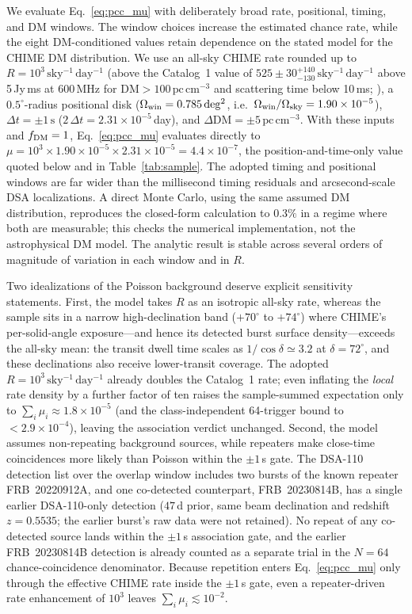 We evaluate Eq.~\eqref{eq:pcc_mu} with deliberately broad rate, positional,
timing, and DM windows. The window choices increase the estimated chance rate,
while the eight DM-conditioned values retain dependence on the stated model for
the CHIME DM distribution. We use an all-sky CHIME rate rounded up to
$R = 10^{3}\,\mathrm{sky^{-1}\,day^{-1}}$ (above the Catalog~1 value of
$525\pm30^{+140}_{-130}\,\mathrm{sky^{-1}\,day^{-1}}$ above 5\,Jy\,ms at
600\,MHz for $\mathrm{DM}>100\,\mathrm{pc\,cm^{-3}}$ and scattering time below
10\,ms; \citealt{CHIME2021Catalog}), a
$0.5^{\circ}$-radius positional disk ($\Omega_{\rm win}=0.785\,\mathrm{deg^2}$,
i.e.\ $\Omega_{\rm win}/\Omega_{\rm sky}=1.90\times10^{-5}$),
$\Delta t = \pm1\,\mathrm{s}$ ($2\,\Delta t = 2.31\times10^{-5}$\,day), and
$\Delta\mathrm{DM}=\pm5\,\mathrm{pc\,cm^{-3}}$. With these inputs and
$f_{\rm DM}=1$, Eq.~\eqref{eq:pcc_mu} evaluates directly to
$\mu = 10^{3}\times1.90\times10^{-5}\times2.31\times10^{-5}
= 4.4\times10^{-7}$, the position-and-time-only value quoted below and in
Table~\ref{tab:sample}.
The adopted timing and positional windows are far wider than the millisecond
timing residuals and arcsecond-scale DSA localizations. A direct Monte Carlo,
using the same assumed DM distribution, reproduces the closed-form calculation
to $0.3\%$ in a regime where both are measurable; this checks the numerical
implementation, not the astrophysical DM model. The analytic result is stable
across several orders of magnitude of variation in each window and in $R$.

Two idealizations of the Poisson background deserve explicit sensitivity
statements. First, the model takes $R$ as an isotropic all-sky rate, whereas
the sample sits in a narrow high-declination band ($+70^{\circ}$ to
$+74^{\circ}$) where CHIME's per-solid-angle exposure---and hence its detected
burst surface density---exceeds the all-sky mean: the transit dwell time
scales as $1/\cos\delta\simeq3.2$ at $\delta=72^{\circ}$, and these
declinations also receive lower-transit coverage. The adopted
$R=10^{3}\,\mathrm{sky^{-1}\,day^{-1}}$ already doubles the Catalog~1 rate;
even inflating the \emph{local} rate density by a further factor of ten
raises the sample-summed expectation only to
$\sum_i\mu_i\approx1.8\times10^{-5}$ (and the class-independent 64-trigger
bound to $<2.9\times10^{-4}$), leaving the association verdict unchanged.
Second, the model assumes non-repeating background sources, while repeaters
make close-time coincidences more likely than Poisson within the $\pm1$\,s
gate. The DSA-110 detection list over the overlap window includes two bursts
of the known repeater FRB~20220912A, and one co-detected counterpart,
FRB~20230814B, has a single earlier DSA-110-only detection ($47$\,d prior, same
beam declination and redshift $z=0.5535$; the earlier burst's raw data were not
retained). No repeat of any co-detected source lands within the $\pm1$\,s
association gate, and the earlier FRB~20230814B detection is already counted as
a separate trial in the $N=64$ chance-coincidence denominator. Because
repetition enters Eq.~\eqref{eq:pcc_mu} only through the effective CHIME rate
inside the $\pm1$\,s gate, even a repeater-driven rate enhancement of $10^{3}$
leaves $\sum_i\mu_i\lesssim10^{-2}$.

